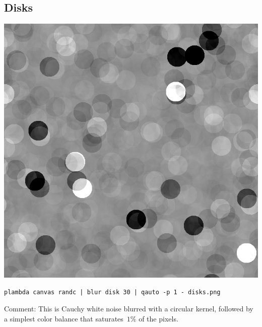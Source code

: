 \subsection{Disks}
\includegraphics{disks.png}
\begin{verbatim}
plambda canvas randc | blur disk 30 | qauto -p 1 - disks.png
\end{verbatim}
Comment: This is Cauchy white noise blurred with a circular kernel, followed
by a simplest color balance that saturates~$1\%$ of the pixels.

